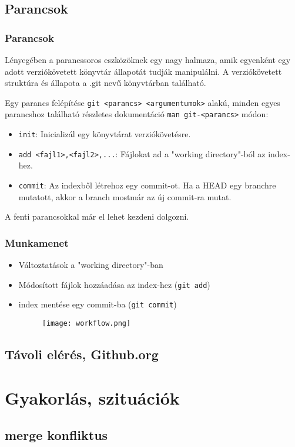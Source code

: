	\subsection{Parancsok}
	\begin{frame}
	  \frametitle{Parancsok}
	  Lényegében a \git parancssoros eszközöknek egy nagy halmaza, amik egyenként egy adott verziókövetett könyvtár állapotát tudják manipulálni. A verziókövetett struktúra és állapota a .git nevű könyvtárban található.

	  Egy \git parancs felépítése \lstinline|git <parancs> <argumentumok>| alakú, minden egyes parancshoz található részletes dokumentáció \lstinline|man git-<parancs>| módon:
	  \begin{itemize}
	    \item \lstinline|init|: Inicializál egy könyvtárat verziókövetésre.
	    \item \lstinline|add <fajl1>,<fajl2>,...|: Fájlokat ad a "working directory"-ból az index-hez.
	    \item \lstinline|commit|: Az indexből létrehoz egy commit-ot. Ha a HEAD egy branchre mutatott, akkor a branch mostmár az új commit-ra mutat.
	  \end{itemize}
	  A fenti parancsokkal már el lehet kezdeni dolgozni.
	\end{frame}

	\begin{frame}
	  \frametitle{Munkamenet}
	  \begin{itemize}
	    \item{Változtatások a "working directory"-ban}
	    \item{Módosított fájlok hozzáadása az index-hez (\lstinline+git add+)}
	    \item{index mentése egy commit-ba (\lstinline+git commit+)}
	      \begin{figure}
		\centering
		\texttt{[image: workflow.png]}
	      \end{figure}
	  \end{itemize}
	\end{frame}
	\subsection{Távoli elérés, Github.org}

\section{Gyakorlás, szituációk}
	\subsection{merge konfliktus}
